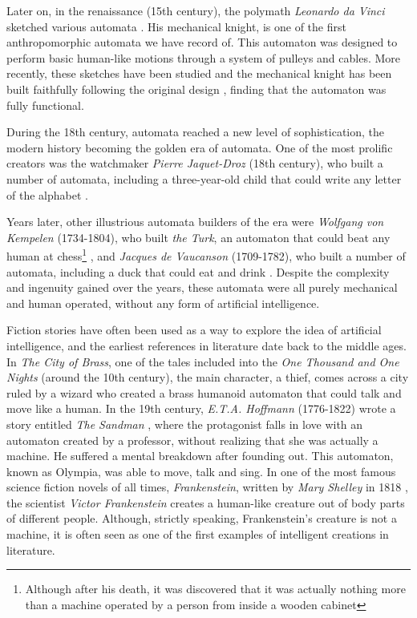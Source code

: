 Later on, in the renaissance (15th century), the polymath \textit{Leonardo da Vinci} sketched various automata \autocite{nils2009}. His mechanical knight, is one of the first anthropomorphic automata we have record of. This automaton was designed to perform basic human-like motions through a system of pulleys and cables. More recently, these sketches have been studied and the mechanical knight has been built faithfully following the original design \autocite{elling2006}, finding that the automaton was fully functional. 

During the 18th century, automata reached a new level of sophistication, the modern history becoming the golden era of automata. One of the most prolific creators was the watchmaker \textit{Pierre Jaquet-Droz} (18th century), who built a number of automata, including a three-year-old child that could write any letter of the alphabet \autocite{carrera1979}.

Years later, other illustrious automata builders of the era were \textit{Wolfgang von Kempelen} (1734-1804), who built \textit{the Turk}, an automaton that could beat any human at chess\footnote{Although after his death, it was discovered that it was actually nothing more than a machine operated by a person from inside a wooden cabinet} \autocite{jay2000}, 
and \textit{Jacques de Vaucanson} (1709-1782), who built a number of automata, including a duck that could eat and drink \autocite{nils2009, trymbaka2022}. Despite the complexity and ingenuity gained over the years, these automata were all purely mechanical and human operated, without any form of artificial intelligence. 

Fiction stories have often been used as a way to explore the idea of artificial intelligence, and the earliest references in literature date back to the middle ages. In \textit{The City of Brass}, one of the tales included into the \textit{One Thousand and One Nights} (around the 10th century), the main character, a thief, comes across a city ruled by a wizard who created a brass humanoid automaton that could talk and move like a human. In the 19th century, \textit{E.T.A. Hoffmann} (1776-1822) wrote a story entitled \textit{The Sandman} \autocite{hoffmann1816}, where the protagonist falls in love with an automaton created by a professor, without realizing that she was actually a machine. He suffered a mental breakdown after founding out. This automaton, known as Olympia, was able to move, talk and sing. In one of the most famous science fiction novels of all times, \textit{Frankenstein}, written by \textit{Mary Shelley} in 1818 \autocite{shelley1994}, the scientist \textit{Victor Frankenstein} creates a human-like creature out of body parts of different people. Although, strictly speaking, Frankenstein's creature is not a machine, it is often seen as one of the first examples of intelligent creations in literature.

